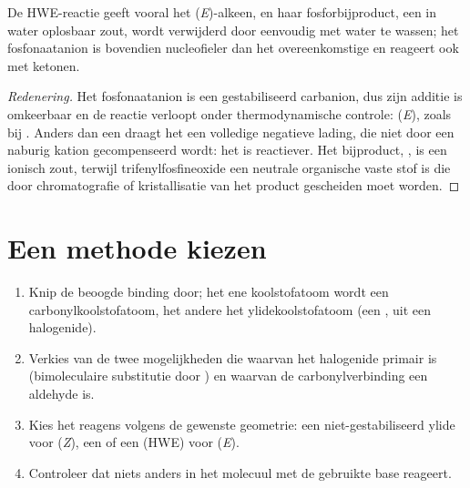 \begin{proposition}\label{prop:b2:wittig:hwe}
De HWE-reactie geeft vooral het (\textit{E})-alkeen, en haar fosforbijproduct, een in water oplosbaar
zout, wordt verwijderd door eenvoudig met water te wassen; het fosfonaatanion is bovendien nucleofieler dan het
overeenkomstige  en reageert ook met ketonen.
\end{proposition}

\begin{proof}[Redenering]
Het fosfonaatanion is een gestabiliseerd carbanion, dus zijn additie is omkeerbaar en de reactie verloopt
onder thermodynamische controle: (\textit{E}), zoals bij . Anders dan een 
draagt het een volledige negatieve lading, die niet door een naburig kation gecompenseerd wordt: het is reactiever. Het
bijproduct, , is een ionisch zout, terwijl trifenylfosfineoxide een neutrale organische
vaste stof is die door chromatografie of kristallisatie van het product gescheiden moet worden.
\end{proof}

\section{Een methode kiezen}

\begin{method}[Wittigdisconnectie]\label{met:b2:wittig:wittig-disconnection}
\begin{enumerate}
  \item Knip de beoogde binding  door; het ene koolstofatoom wordt een carbonylkoolstofatoom, het andere het ylidekoolstofatoom
        (een , uit een halogenide).
  \item Verkies van de twee mogelijkheden die waarvan het halogenide primair is (bimoleculaire substitutie door
        ) en waarvan de carbonylverbinding een aldehyde is.
  \item Kies het reagens volgens de gewenste geometrie: een niet-gestabiliseerd ylide voor (\textit{Z}), een
         of een  (HWE) voor (\textit{E}).
  \item Controleer dat niets anders in het molecuul met de gebruikte base reageert.
\end{enumerate}
\end{method}

